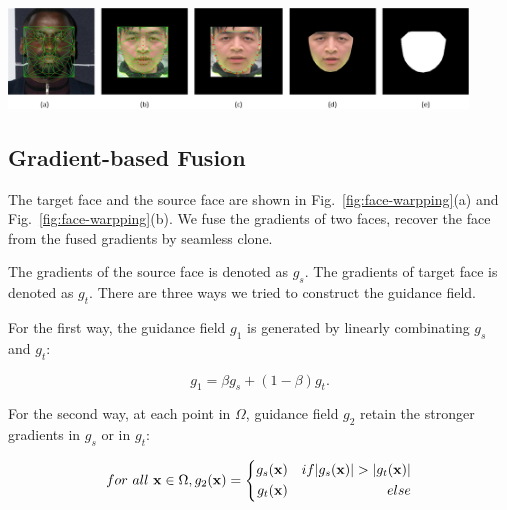 

\begin{center}
    \includegraphics[width=4.8in]{images/extract.png}
    \label{fig:face-warpping}
\end{center}


\subsection{Gradient-based Fusion}
\label{sec:fusion}

The target face and the source face are shown in Fig.~\ref{fig:face-warpping}(a) and Fig.~\ref{fig:face-warpping}(b). We fuse the gradients of two faces, recover the face from the fused gradients by seamless clone.

The gradients of the source face is denoted as $g_s$. The gradients of target face is denoted as $g_t$. There are three ways we tried to construct the guidance field.

For the first way, the guidance field $g_1$ is generated  by linearly combinating $g_s$ and $g_t$:

\begin{equation}
\label{eq:gradient-linear}
g_1 = \beta g_s+(1-\beta) g_t.
\end{equation}

For the second way, at each point in $\Omega$, guidance field $g_2$ retain the stronger gradients in $g_s$ or in $g_t$:

\begin{equation}
\label{eq:gradient-mixed}
for\ all\ \vb{x} \in \Omega, g_2(\vb{x})=\left\{
\begin{aligned}
g_s(\vb{x}) &&{if |g_s(\vb{x})|>|g_t(\vb{x})|}\\
g_t(\vb{x}) &&{else}\\
\end{aligned}
\right.
\end{equation}

